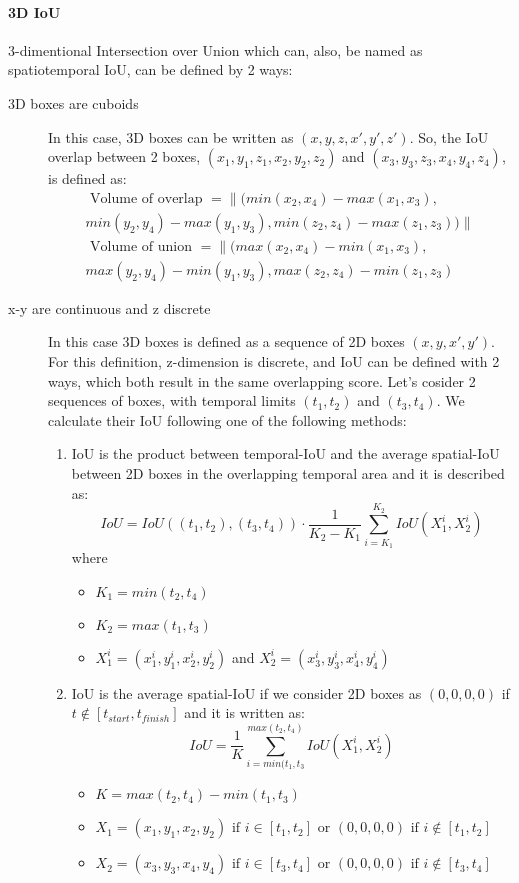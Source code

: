 \paragraph{3D IoU} 3-dimentional Intersection over Union which can, also, be named as spatiotemporal IoU, can be defined by 2 ways:
\begin{description}
\item[3D boxes are cuboids] In this case, 3D boxes can be written  as $(x,y,z,x',y',z')$.
So, the IoU overlap between 2 boxes, $(x_1,y_1,z_1,x_2,y_2,z_2)$
  and $(x_3,y_3,z_3,x_4,y_4,z_4)$, is defined as:
\begin{equation*} 
\begin{split}
  \text { Volume of overlap } = \lVert(min(x_2,x_4) - max(x_1,x_3), \\
  min(y_2,y_4) -  max(y_1,y_3), min(z_2,z_4) -  max(z_1,z_3) ) \rVert  \\
\text { Volume of union } = \lVert(max(x_2,x_4) - min(x_1,x_3), \\
 max(y_2,y_4) - min(y_1,y_3), max(z_2,z_4) - min(z_1,z_3)
\end{split}
\end{equation*}

\item[x-y are continuous and z discrete] In this case 3D boxes is defined as a sequence of 2D boxes $(x,y,x',y')$. For this definition, z-dimension is
  discrete, and IoU can be defined with 2 ways, which both result in the same overlapping score. Let's cosider 2 sequences of boxes, with temporal limits
  $(t_1,t_2)$ and $(t_3,t_4)$. We calculate their IoU following one of the following methods:
  \begin{enumerate}
\item IoU is the product between temporal-IoU and the average spatial-IoU between 2D boxes in the overlapping temporal area and it is described as:
\[ IoU =  IoU((t_1,t_2),(t_3,t_4)) \cdot \frac{1}{K_2-K_1} \sum_{i=K_1}^{K_2} IoU(X_1^i, X_2^i) \]
  where \begin{itemize}
  \item$K_1 = min(t_2,t_4)$
  \item$K_2 = max(t_1,t_3)$
  \item$ X_1^i =  (x_1^i,y_1^i,x_2^i,y_2^i)$ and $X_2^i =  (x_3^i,y_3^i,x_4^i,y_4^i) $
  \end{itemize}
\item IoU is the average spatial-IoU if we consider 2D boxes as $(0,0,0,0)$ if $ t \notin [t_{start},t_{finish}]$ and it is written as:
  \[ IoU = \frac{1}{K} \sum_{i = min(t_1,t_3}^{max(t_2,t_4)} IoU(X_1^i,X_2^i) \]
  \begin{itemize}
  \item $K = max(t_2,t_4) - min(t_1,t_3)$
  \item $ X_1 = (x_1,y_1,x_2,y_2)  \text{ if } i \in [t_1,t_2] \text{ or }
        (0,0,0,0)  \text{ if } i \notin [t_1,t_2]  $
  \item $ X_2 = (x_3,y_3,x_4,y_4)  \text{ if } i \in [t_3,t_4] \text{ or }
        (0,0,0,0)  \text{ if } i \notin [t_3,t_4]  $
    \end{itemize}
  

\end{enumerate}
\end{description}
